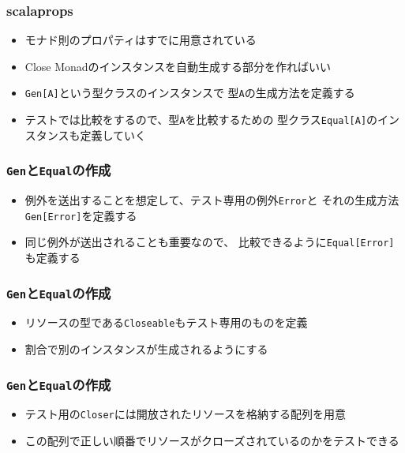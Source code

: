 \begin{frame}
  \frametitle{scalaprops}

  \begin{itemize}
    \item<2-> モナド則のプロパティはすでに用意されている
    \item<3-> Close Monadのインスタンスを自動生成する部分を作ればいい
    \item<4-> \lstinline|Gen[A]|という型クラスのインスタンスで
    型\lstinline|A|の生成方法を定義する
    \item<5-> テストでは比較をするので、型\lstinline|A|を比較するための
    型クラス\lstinline|Equal[A]|のインスタンスも定義していく
  \end{itemize}
\end{frame}

\begin{frame}
  \frametitle{\protect\lstinline|Gen|と\protect\lstinline|Equal|の作成}


  \begin{itemize}
    \item<3-> 例外を送出することを想定して、テスト専用の例外\lstinline|Error|と
    それの生成方法\lstinline|Gen[Error]|を定義する
    \item<4-> 同じ例外が送出されることも重要なので、
    比較できるように\lstinline|Equal[Error]|も定義する
  \end{itemize}
\end{frame}

\begin{frame}
  \frametitle{\protect\lstinline|Gen|と\protect\lstinline|Equal|の作成}

  
  

  \begin{itemize}
    \item<2-> リソースの型である\lstinline|Closeable|もテスト専用のものを定義
    \item<3-> 割合で別のインスタンスが生成されるようにする
  \end{itemize}
\end{frame}

\begin{frame}
  \frametitle{\protect\lstinline|Gen|と\protect\lstinline|Equal|の作成}

  
  

  \begin{itemize}
    \item<2-> テスト用の\lstinline|Closer|には開放されたリソースを格納する配列を用意
    \item<3-> この配列で正しい順番でリソースがクローズされているのかをテストできる
  \end{itemize}
\end{frame}

